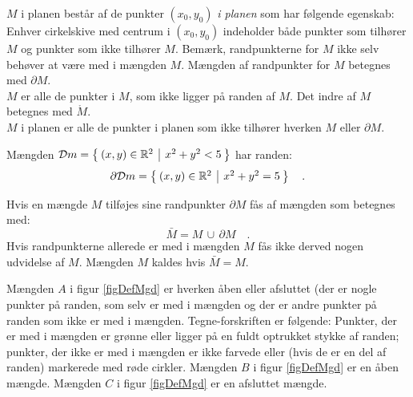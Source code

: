 \begin{definition} \label{defAAbenMgd}
 $M$  i planen består af de punkter $(x_{0}, y_{0})$ \emph{i planen} som har følgende egenskab:
Enhver cirkelskive med centrum i $(x_{0}, y_{0})$ indeholder både punkter som tilhører $M$ og punkter som ikke tilhører $M$.
Bemærk, randpunkterne for $M$ ikke selv behøver at være med i mængden $M$. Mængden af randpunkter for $M$ betegnes med $\partial M$.\\

 $M$ er alle de punkter i $M$, som ikke ligger på randen af $M$. Det indre af $M$ betegnes med $\mathring{M}$.\\

 $M$ i planen er alle de punkter i planen som ikke tilhører hverken $M$ eller  $\partial M$.
\end{definition}

\begin{example}
Mængden $\mathcal{D}m = \left\lbrace \hspace*{-1mm} \begin{array}{c|c} (x,y) \in \mathbb{R}^{2}  & x^{2} + y^{2} < 5 \end{array} \hspace*{-1mm} \right\rbrace$ har randen:
\begin{equation}
\partial \mathcal{D}m = \left\lbrace \hspace*{-1mm} \begin{array}{c|c} (x,y) \in \mathbb{R}^{2}  & x^{2} + y^{2} =  5 \end{array} \hspace*{-1mm} \right\rbrace \quad .
\end{equation}
\end{example}

\begin{definition}
Hvis en mængde $M$ tilføjes sine randpunkter $\partial M$ fås   af mængden som  betegnes med:
\begin{equation}
\bar{M} = M \, \cup \, \partial M \quad.
\end{equation}
Hvis randpunkterne allerede er med i mængden $M$ fås ikke derved nogen udvidelse af $M$. Mængden $M$ kaldes  hvis $\bar{M} = M$.
\end{definition}

\begin{example}
Mængden $A$ i figur \ref{figDefMgd} er hverken åben eller afsluttet (der er nogle punkter på randen, som selv er med i mængden og der er andre punkter på randen som ikke er med i mængden. Tegne-forskriften er følgende: Punkter, der er med i mængden er grønne eller ligger på en fuldt optrukket stykke af randen; punkter, der ikke er med i mængden er ikke farvede eller (hvis de er en del af randen) markerede med røde cirkler. Mængden $B$ i figur  \ref{figDefMgd} er en åben mængde. Mængden $C$ i figur  \ref{figDefMgd} er en afsluttet mængde.
\end{example}



